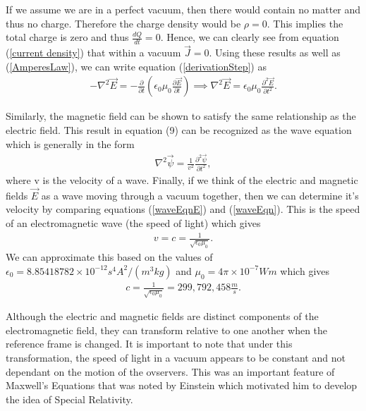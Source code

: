 If we assume we are in a perfect vacuum, then there would contain no matter and thus no charge. Therefore the charge density would be $\rho=0$. This implies the total charge is zero and thus $\frac{dQ}{dt}=0$. Hence, we can clearly see from equation (\ref{current density}) that within a vacuum $\vec{J}=0$. Using these results as well as (\ref{AmperesLaw}), we can write equation (\ref{derivationStep}) as
\begin{align}
	-\nabla^2\vec{E} = -\frac{\partial}{\partial t}\left(\epsilon_0\mu_0\frac{\partial \vec{E}}{\partial t}\right) \implies \nabla^2\vec{E} = \epsilon_0\mu_0\frac{\partial^2 \vec{E}}{\partial t^2}. \label{waveEqnE}
\end{align}

Similarly, the magnetic field can be shown to satisfy the same relationship as the electric field. This result in equation (9) can be recognized as the wave equation which is generally in the form
\begin{align}
	\nabla^2\vec{\psi} = \frac{1}{v^2}\frac{\partial^2 \vec{\psi}}{\partial t^2},\label{waveEqn}
\end{align}
where v is the velocity of a wave. Finally, if we think of the electric and magnetic fields $\vec{E}$ as a wave moving through a vacuum together, then we can determine it's velocity by comparing equations (\ref{waveEqnE}) and (\ref{waveEqn}). This is the speed of an electromagnetic wave (the speed of light) which gives
\begin{align}
	v=c=\frac{1}{\sqrt{\epsilon_0\mu_0}}.
\end{align}
We can approximate this based on the values of $\epsilon_0 = 8.85418782 \times 10^{-12}  s^4 A^2/(m^3 kg)$ and $\mu_0 =4\pi \times 10^{-7} Wm$ which gives
\begin{align}
	c=\frac{1}{\sqrt{\epsilon_0\mu_0}} = \boxed{299,792,458 \frac{m}{s}}.
\end{align}

\begin{interestnote}
Although the electric and magnetic fields are distinct components of the electromagnetic field, they can transform relative to one another when the reference frame is changed. It is important to note that under this transformation, the speed of light in a vacuum appears to be constant and not dependant on the motion of the ovservers. This was an important feature of Maxwell's Equations that was noted by Einstein which motivated him to develop the idea of Special Relativity. \label{speed of light constant in all reference frames note}
\end{interestnote}
